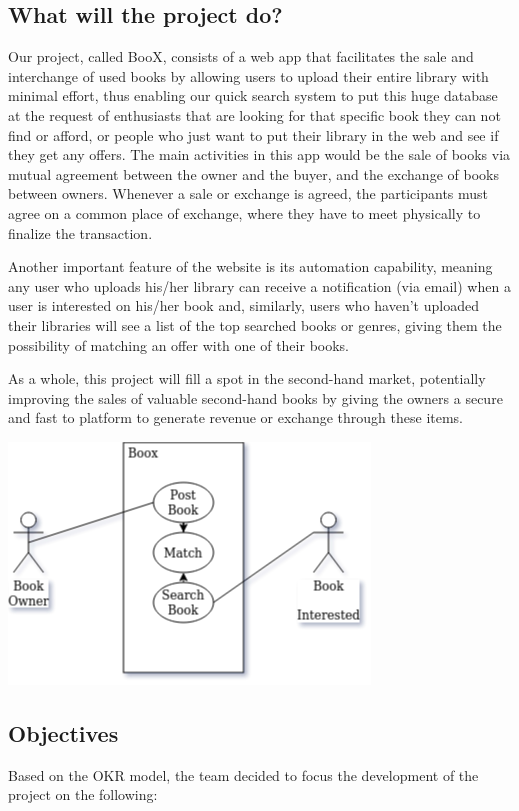 \documentclass{article}
\begin{document}
\subsection{What will the project do?}
Our project, called BooX, consists of a web app that facilitates the sale and interchange of used books by allowing users to upload their entire library with minimal effort, thus enabling our quick search system to put this huge database at the request of enthusiasts that are looking for that specific book they can not find or afford, or people who just want to put their library in the web and see if they get any offers. The main activities in this app would be the sale of books via mutual agreement between the owner and the buyer, and the exchange of books between owners. Whenever a sale or exchange is agreed, the participants must agree on a common place of exchange, where they have to meet physically to finalize the transaction.

Another important feature of the website is its automation capability, meaning any user who uploads his/her library can receive a notification (via email) when a user is interested on his/her book and, similarly, users who haven't uploaded their libraries will see a list of the top searched books or genres, giving them the possibility of matching an offer with one of their books.

As a whole, this project will fill a spot in the second-hand market, potentially improving the sales of valuable second-hand books by giving the owners a secure and fast to platform to generate revenue or exchange through these items.

\begin{center}
\includegraphics[scale=0.5]{img/diagram.png}    
\end{center}

\subsection{Objectives}
Based on the OKR model, the team decided to focus the development of the project on the following:
\end{document}
